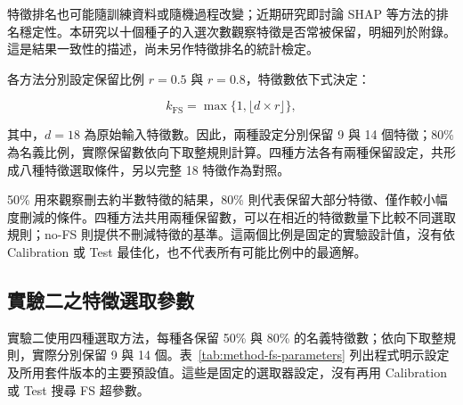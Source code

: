 特徵排名也可能隨訓練資料或隨機過程改變；近期研究即討論 SHAP 等方法的排名穩定性\autocite{goldwasser2025rankings}。本研究以十個種子的入選次數觀察特徵是否常被保留，明細列於附錄。這是結果一致性的描述，尚未另作特徵排名的統計檢定。

各方法分別設定保留比例 \(r=0.5\) 與 \(r=0.8\)，特徵數依下式決定：

\begin{equation}\label{eq:method-fs-count}
k_{\mathrm{FS}}=\max\{1,\lfloor d\times r\rfloor\},
\end{equation}

其中，\(d=18\) 為原始輸入特徵數。因此，兩種設定分別保留 9 與 14 個特徵；80\% 為名義比例，實際保留數依向下取整規則計算。四種方法各有兩種保留設定，共形成八種特徵選取條件，另以完整 18 特徵作為對照。

50\% 用來觀察刪去約半數特徵的結果，80\% 則代表保留大部分特徵、僅作較小幅度刪減的條件。四種方法共用兩種保留數，可以在相近的特徵數量下比較不同選取規則；no-FS 則提供不刪減特徵的基準。這兩個比例是固定的實驗設計值，沒有依 Calibration 或 Test 最佳化，也不代表所有可能比例中的最適解。

\subsection{實驗二之特徵選取參數}\label{sec:method-fs-parameters}

實驗二使用四種選取方法，每種各保留 50\% 與 80\% 的名義特徵數；依向下取整規則，實際分別保留 9 與 14 個。表~\ref{tab:method-fs-parameters} 列出程式明示設定及所用套件版本的主要預設值。這些是固定的選取器設定，沒有再用 Calibration 或 Test 搜尋 FS 超參數。

